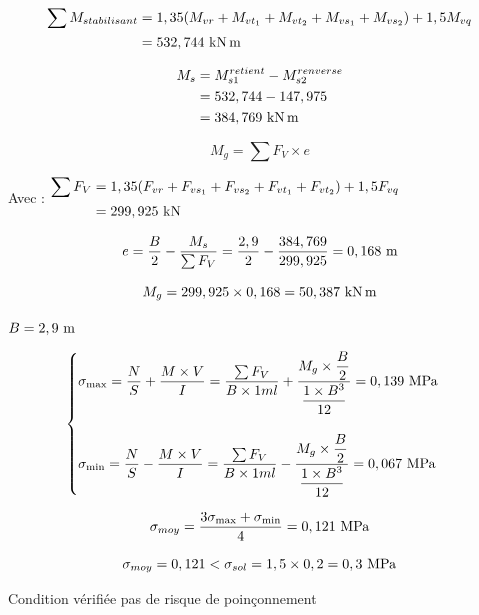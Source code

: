 \documentclass[12pt,a4paper]{report}
\newcommand{\sgma}[1]{\sigma_{#1}}
\newcommand{\fV}{F_{V}}
\newcommand{\fvr}{F_{vr}}
\newcommand{\fvs}{F_{vs_{1}}}
\newcommand{\fvss}{F_{vs_{2}}}
\newcommand{\fvt}{F_{vt_{1}}}
\newcommand{\fvtt}{F_{vt_{2}}}
\newcommand{\fvq}{F_{vq}}
\newcommand{\mvr}{M_{vr}}
\newcommand{\mvs}{M_{vs_{1}}}
\newcommand{\mvss}{M_{vs_{2}}}
\newcommand{\mvt}{M_{vt_{1}}}
\newcommand{\mvtt}{M_{vt_{2}}}
\newcommand{\mvq}{M_{vq}}
\begin{document}
	\[ \begin{aligned}
		\sum M_{stabilisant} &= 1,35( \mvr + \mvt + \mvtt + \mvs + \mvss) + 1,5 \mvq \\
		&= 532,744\knxm 
	\end{aligned} \]
	
	
	\[ \begin{aligned}
		M_{s} &= M_{s1}^{retient} - M_{s2}^{renverse} \\
		&= 532,744 - 147,975 \\
		&= 384,769\knxm
	\end{aligned} \]
	
	
	\vspace{\baselineskip}
	
	\[ M_{g} = \sum \fV \times e \]
	
	\vspace{\baselineskip}
	
	Avec : $\begin{aligned}
		\sum \fV &= 1,35(\fvr + \fvs + \fvss + \fvt + \fvtt) + 1,5\fvq\\
		&= 299,925\kn
	\end{aligned}$
	
	\vspace{\baselineskip}
	
	\[ e = \dfrac{B}{2} - \dfrac{M_{s}}{\sum \fV} = \dfrac{2,9}{2} - \dfrac{384,769}{299,925} = 0,168\meterl \]
	
	\[ M_{g} = 299,925 \times 0,168 = 50,387\knxm \]
	
	
	$B = 2,9\meterl$
	
	\[ \begin{cases}
		\sgma{\max} = \dfrac{N}{S} + \dfrac{M \times V}{I} = \dfrac{\sum \fV}{B \times 1ml} + \dfrac{M_{g} \times \dfrac{B}{2}}{\dfrac{1 \times B^{3}}{12}} = 0,139\mpa \\ \\
		\sgma{\min} = \dfrac{N}{S} - \dfrac{M \times V}{I} = \dfrac{\sum \fV}{B \times 1ml} - \dfrac{M_{g} \times \dfrac{B}{2}}{\dfrac{1 \times B^{3}}{12}} = 0,067\mpa
	\end{cases} \]
	
	\[ \sgma{moy} = \dfrac{3\sgma{\max} + \sgma{\min}}{4} = 0,121\mpa \]
	
	\[ \sgma{moy} = 0,121 < \sgma{sol} = 1,5 \times 0,2 = 0,3\mpa \]
	
	{\centering Condition vérifiée pas de risque de poinçonnement \par}
	
	
	
\end{document}
